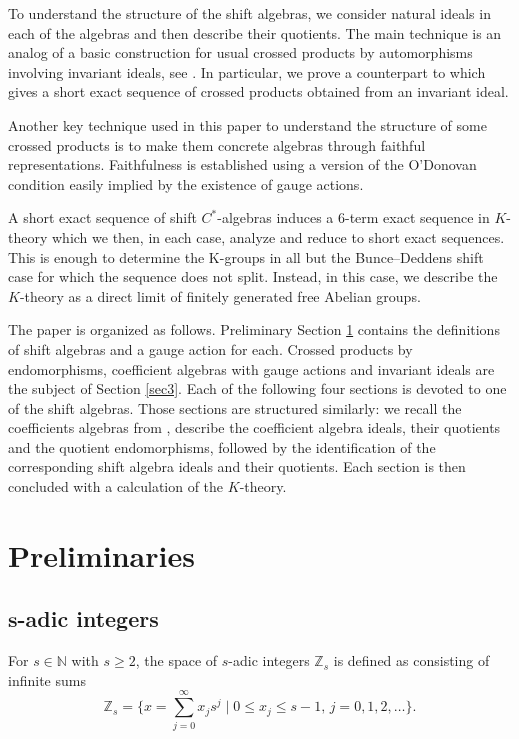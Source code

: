 \documentclass[10pt,a4paper]{amsart}
\newcommand{\N}{{\mathbb N}}
\newcommand{\Z}{{\mathbb Z}}
\numberwithin{equation}{section}
\begin{document}
To understand the structure of the shift algebras, we consider natural ideals in each of the algebras and then describe their quotients. The main technique is an analog of a basic construction for usual crossed products by automorphisms involving invariant ideals, see \cite[Section~3.4]{Williams}. In particular, we prove a counterpart to \cite[Proposition 3.19]{Williams} which gives a short exact sequence of crossed products obtained from an invariant ideal.

Another key technique used in this paper to understand the structure of some crossed products is to make them concrete algebras through faithful representations. Faithfulness is established using a version of the O'Donovan condition easily implied by the existence of gauge actions.

A short exact sequence of shift $C^*$-algebras induces a $6$-term exact sequence in $K$-theory which we then, in each case, analyze and reduce to short exact sequences. This is enough to determine the K-groups in all but the Bunce--Deddens shift case for which the sequence does not split. Instead, in this case, we describe the $K$-theory as a direct limit of finitely generated free Abelian groups.

The paper is organized as follows. Preliminary Section \ref{sec2} contains the definitions of shift algebras and a gauge action for each. Crossed products by endomorphisms, coefficient algebras with gauge actions and invariant ideals are the subject of Section \ref{sec3}. Each of the following four sections is devoted to one of the shift algebras. Those sections are structured similarly: we recall the coefficients algebras from \cite{HKMP3}, describe the coefficient algebra ideals, their quotients and the quotient endomorphisms, followed by the identification of the corresponding shift algebra ideals and their quotients. Each section is then concluded with a calculation of the $K$-theory.

\section{Preliminaries}\label{sec2}
\subsection[s-adic integers]{$\boldsymbol{s}$-adic integers}
For $s\in\N$ with $s\ge2$, the space of $s$-adic integers $\Z_s$ is defined as consisting of infinite sums
\begin{equation*}
\Z_s= \Biggl\{x=\sum_{j=0}^\infty x_j s^j\mid 0\le x_j\le s-1, \, j=0,1,2,\dots\Biggr\} .
\end{equation*}
\end{document}
